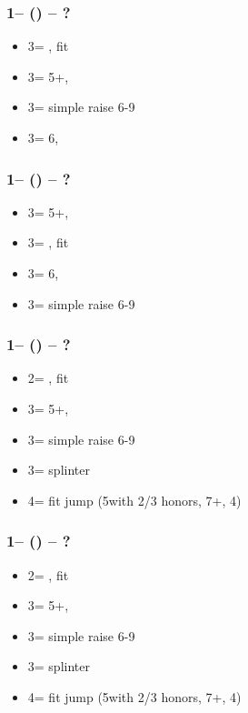\documentclass[12pt, a4paper]{report}
\begin{document}
\subsubsection*{1\hearts -- (\alrts{2\nt}) -- ?}
\begin{itemize}
    \item 3\clubs = \invp, fit
    \item 3\diams = 5+\spades, \gf
    \item 3\hearts = simple raise 6-9
    \item 3\spades = 6\spades, \nf \imp
\end{itemize}

\subsubsection*{1\spades -- (\alrts{2\nt}) -- ?}
\begin{itemize}
    \item 3\clubs = 5+\hearts, \gf
    \item 3\diams = \invp, fit
    \item 3\hearts = 6\hearts, \nf \imp
    \item 3\spades = simple raise 6-9
\end{itemize}

\subsubsection*{1\hearts -- (\alrts{2\hearts}) -- ?}
\begin{itemize}
    \item 2\spades = \invp, fit
    \item 3\minor = 5+, \gf
    \item 3\hearts = simple raise 6-9
    \item 3\spades = splinter
    \item 4\minor = fit jump (5\minor with 2/3 honors, 7+, 4\hearts)
\end{itemize}

\subsubsection*{1\spades -- (\alrts{2\spades}) -- ?}
\begin{itemize}
    \item 2\spades = \invp, fit
    \item 3\minor = 5+, \gf
    \item 3\hearts = simple raise 6-9
    \item 3\spades = splinter
    \item 4\minor = fit jump (5\minor with 2/3 honors, 7+, 4\hearts)
\end{itemize}
\end{document}
